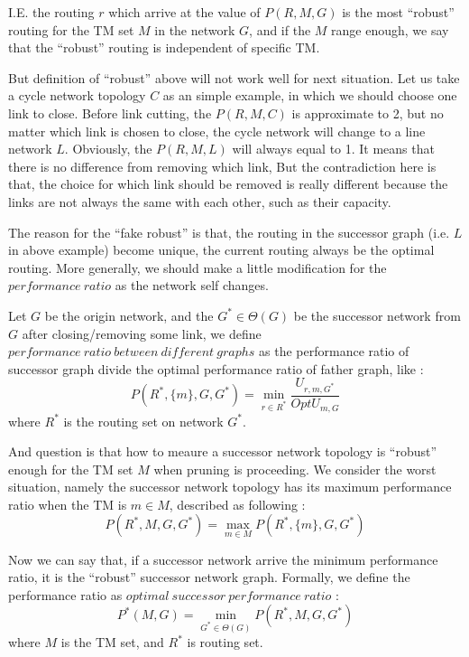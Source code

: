 \documentclass[conference]{IEEEtran}
\begin{document}
I.E. the routing $r$ which arrive at the value of $P(R,M,G)$ is the most ``robust'' routing for the TM set $M$ 
in the network $G$, and if the $M$ range enough, we say that the ``robust'' routing is independent of specific TM.

But definition of ``robust'' above will not work well for next situation. Let us take a cycle network topology $C$ as 
an simple example, in which we should choose one link to close. Before link cutting, the $P(R, M, C)$ is 
approximate to 2, but no matter which link is chosen to close, the cycle network will change to a line network $L$. 
Obviously, the $P(R, M, L)$ will always equal to 1. It means that there is no difference from removing which link,
But the contradiction here is that, the choice for which link should be removed is really different because the 
links are not always the same with each other, such as their capacity.

The reason for the ``fake robust'' is that, the routing in the successor graph (i.e. $L$ in above example) become 
unique, the current routing always be the optimal routing. More generally, we should make a little modification
for the $performance\ ratio$ as the network self changes.

Let $G$ be the origin network, and the $G^* \in \Theta(G)$ be the successor network from $G$ after closing/removing
some link, we define $performance\ ratio\ between\ different\ graphs$ as the performance ratio of successor graph divide 
the optimal performance ratio of father graph, like :
\begin{equation}
	P(R^*, \{ m\}, G, G^*) = \min_{r \in R^*} \frac{U_{r,m,G^*}}{OptU_{m,G}}
\end{equation}
where $R^*$ is the routing set on network $G^*$.

And question is that how to meaure a successor network topology is ``robust'' enough for the TM set $M$ when 
pruning is proceeding. We consider the worst situation, namely the successor network topology has its maximum
performance ratio when the TM is $m \in M$, described as following :
\begin{equation}
	P(R^*, M, G, G^*) = \max_{m \in M} P(R^*, \{ m \}, G, G^*)
\end{equation}

Now we can say that, if a successor network arrive the minimum performance ratio, it is the ``robust'' successor 
network graph. Formally, we define the performance ratio as $optimal\ successor\ performance\ ratio$ :
\begin{equation}
	P^{*}(M, G) = \min_{G^* \in \Theta(G)} P(R^*, M, G, G^*)
\end{equation}
where $M$ is the TM set, and $R^*$ is routing set. 
\end{document}
